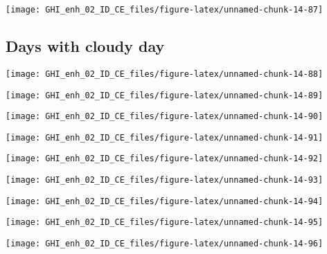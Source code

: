 \documentclass[
  10pt,
  a4paper,oneside]{article}
\begin{document}
\begin{center}\texttt{[image: GHI\_enh\_02\_ID\_CE\_files/figure-latex/unnamed-chunk-14-87]} \end{center}

\FloatBarrier

\hypertarget{days-with-cloudy-day}{%
\subsection{Days with cloudy day}\label{days-with-cloudy-day}}

\begin{center}\texttt{[image: GHI\_enh\_02\_ID\_CE\_files/figure-latex/unnamed-chunk-14-88]} \end{center}

\begin{center}\texttt{[image: GHI\_enh\_02\_ID\_CE\_files/figure-latex/unnamed-chunk-14-89]} \end{center}

\begin{center}\texttt{[image: GHI\_enh\_02\_ID\_CE\_files/figure-latex/unnamed-chunk-14-90]} \end{center}

\begin{center}\texttt{[image: GHI\_enh\_02\_ID\_CE\_files/figure-latex/unnamed-chunk-14-91]} \end{center}

\begin{center}\texttt{[image: GHI\_enh\_02\_ID\_CE\_files/figure-latex/unnamed-chunk-14-92]} \end{center}

\begin{center}\texttt{[image: GHI\_enh\_02\_ID\_CE\_files/figure-latex/unnamed-chunk-14-93]} \end{center}

\begin{center}\texttt{[image: GHI\_enh\_02\_ID\_CE\_files/figure-latex/unnamed-chunk-14-94]} \end{center}

\begin{center}\texttt{[image: GHI\_enh\_02\_ID\_CE\_files/figure-latex/unnamed-chunk-14-95]} \end{center}

\begin{center}\texttt{[image: GHI\_enh\_02\_ID\_CE\_files/figure-latex/unnamed-chunk-14-96]} \end{center}
\end{document}
